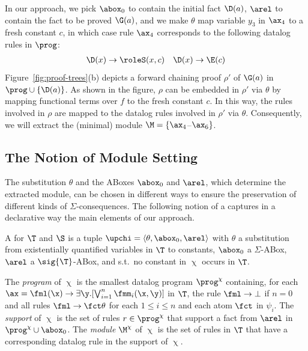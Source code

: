 In our approach, we pick
$\abox_0$ to contain the initial fact $\D(a)$, $\arel$ to contain
the fact to be proved $\G(a)$, and we make $\theta$
map variable $y_3$ in $\ax_4$
to a fresh constant $c$, in which case rule
$\ax_4$ corresponds to the following datalog rules in $\prog$:
%
\begin{align*}
\D(x) \to \roleS(x,c) && \D(x) \to \E(c)
\end{align*}
%
Figure~\ref{fig:proof-trees}(b) depicts a forward chaining
proof $\rho'$ of $\G(a)$ in 
$\prog \cup \{\D(a)\}$.
As shown in the figure, $\rho$ can be embedded in $\rho'$ via $\theta$ by
mapping functional terms over $f$ 
to the fresh constant $c$. In this way, the rules
involved in $\rho$ are mapped to the datalog rules involved in $\rho'$
via $\theta$. Consequently, we will extract the (minimal) module $\M = \{\ax_4$--$\ax_6\}$. 

\subsection{The Notion of Module Setting}

The substitution $\theta$ and the ABoxes $\abox_0$
and $\arel$, which determine the extracted module, can be chosen
in different ways to ensure the preservation of different kinds of $\Sigma$-consequences.
The following notion of
a \bla{} captures in a declarative way the main elements of
our approach.


\begin{definition}
\label{def:bla}
A \emph{\bla} for $\T$ and $\S$ is a tuple 
$\upchi = \langle \theta, \abox_0, \arel \rangle$ 
with
$\theta$ a substitution from existentially quantified
variables in $\T$ to constants,
$\abox_0$ a $\Sigma$-ABox,
$\arel$ a \hbox{$\sig{\T}$}-ABox, and s.t.\
no constant in $\upchi$ occurs in $\T$.

 
The \emph{program} of $\upchi$ is the smallest datalog program
$\prog^{\chi}$ containing, for each
$\ax=\fml(\x)\to\exists\y.[\bigvee_{i=1}^n\fmm_i(\x,\y)]$ in $\T$, the
rule $\fml \rightarrow \bot$ if $n = 0$ and all rules $\fml \to
\fct\theta$ for each $1 \leq i \leq n$ and each atom $\fct$ in
$\psi_i$.  The \emph{support} of $\upchi$ is the set of rules $r \in
\prog^{\chi}$ that support a fact from $\arel$ in $\prog^{\chi} \cup
\abox_0$.  The \emph{module} $\M^{\chi}$ of $\upchi$ is the set of
rules in $\T$ that have a corresponding datalog rule in the support of
$\upchi$.
\end{definition}

